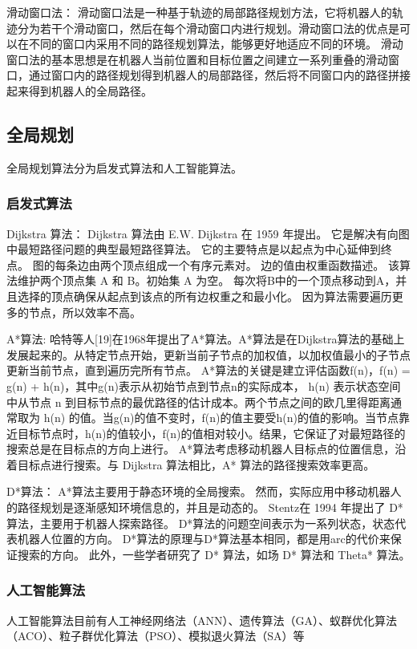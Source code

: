 滑动窗口法：
滑动窗口法是一种基于轨迹的局部路径规划方法，它将机器人的轨迹分为若干个滑动窗口，然后在每个滑动窗口内进行规划。滑动窗口法的优点是可以在不同的窗口内采用不同的路径规划算法，能够更好地适应不同的环境。
滑动窗口法的基本思想是在机器人当前位置和目标位置之间建立一系列重叠的滑动窗口，通过窗口内的路径规划得到机器人的局部路径，然后将不同窗口内的路径拼接起来得到机器人的全局路径。


\subsection{全局规划}
全局规划算法分为启发式算法和人工智能算法。
\subsubsection{启发式算法}
Dijkstra 算法：
Dijkstra 算法由 E.W. Dijkstra 在 1959 年提出。 它是解决有向图中最短路径问题的典型最短路径算法。 它的主要特点是以起点为中心延伸到终点。 图的每条边由两个顶点组成一个有序元素对。 边的值由权重函数描述。 该算法维护两个顶点集 A 和 B。初始集 A 为空。 每次将B中的一个顶点移动到A，并且选择的顶点确保从起点到该点的所有边权重之和最小化。 因为算法需要遍历更多的节点，所以效率不高。

A*算法:
哈特等人[19]在1968年提出了A*算法。A*算法是在Dijkstra算法的基础上发展起来的。从特定节点开始，更新当前子节点的加权值，以加权值最小的子节点更新当前节点，直到遍历完所有节点。 A*算法的关键是建立评估函数f(n)，f(n) = g(n) + h(n)，其中g(n)表示从初始节点到节点n的实际成本， h(n) 表示状态空间中从节点 n 到目标节点的最优路径的估计成本。两个节点之间的欧几里得距离通常取为 h(n) 的值。当g(n)的值不变时，f(n)的值主要受h(n)的值的影响。当节点靠近目标节点时，h(n)的值较小，f(n)的值相对较小。结果，它保证了对最短路径的搜索总是在目标点的方向上进行。 A*算法考虑移动机器人目标点的位置信息，沿着目标点进行搜索。与 Dijkstra 算法相比，A* 算法的路径搜索效率更高。

D*算法：
A*算法主要用于静态环境的全局搜索。 然而，实际应用中移动机器人的路径规划是逐渐感知环境信息的，并且是动态的。 Stentz在 1994 年提出了 D* 算法，主要用于机器人探索路径。 D*算法的问题空间表示为一系列状态，状态代表机器人位置的方向。 D*算法的原理与D*算法基本相同，都是用arc的代价来保证搜索的方向。 此外，一些学者研究了 D* 算法，如场 D* 算法和 Theta* 算法。


\subsubsection{人工智能算法}
人工智能算法目前有人工神经网络法（ANN）、遗传算法（GA）、蚁群优化算法（ACO）、粒子群优化算法（PSO）、模拟退火算法（SA）等

